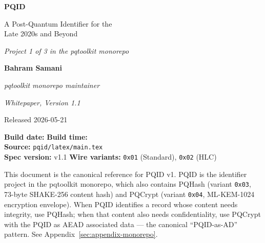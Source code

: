 \documentclass[11pt,letterpaper]{article}
\newcommand{\pqid}{\textsf{PQID}}
\newcommand{\pqhash}{\textsf{PQHash}}
\newcommand{\pqcrypt}{\textsf{PQCrypt}}
\newcommand{\pqtoolkit}{\textsf{pqtoolkit}}
\newcommand{\code}[1]{\texttt{#1}}
\begin{document}
\begin{titlepage}
  \centering
  \vspace*{2.0cm}
  {\Huge\bfseries PQID\par}
  \vspace{0.6cm}
  {\Large A Post-Quantum Identifier for the\\Late 2020s and Beyond\par}
  \vspace{0.3cm}
  {\large\itshape Project 1 of 3 in the \pqtoolkit{} monorepo\par}
  \vspace{1.6cm}
  {\large\bfseries Bahram Samani\par}
  \vspace{0.4em}
  {\small\itshape \pqtoolkit{} monorepo maintainer\par}
  \vspace{1.6cm}
  {\large\itshape Whitepaper, Version 1.1\par}
  \vspace{0.3em}
  {\small Released 2026-05-21\par}
  \vspace{1.6cm}
  \begin{tcolorbox}[colback=gray!5,colframe=black!30,width=0.78\textwidth]
    \centering\small
    \textbf{Build date:} \buildDate \quad\textbf{Build time:} \buildTime\\[0.4em]
    \textbf{Source:} \texttt{pqid/latex/main.tex}\\[0.4em]
    \textbf{Spec version:} v1.1 \quad\textbf{Wire variants:} \texttt{0x01} (Standard), \texttt{0x02} (HLC)
  \end{tcolorbox}
  \vfill
  {\small This document is the canonical reference for PQID v1. PQID is the identifier project in the \pqtoolkit{} monorepo, which also contains \pqhash{} (variant \code{0x03}, 73-byte SHAKE-256 content hash) and \pqcrypt{} (variant \code{0x04}, ML-KEM-1024 encryption envelope). When PQID identifies a record whose content needs integrity, use \pqhash{}; when that content also needs confidentiality, use \pqcrypt{} with the PQID as AEAD associated data --- the canonical ``\pqid{}-as-AD'' pattern. See Appendix~\ref{sec:appendix-monorepo}.\par}
  \vspace{0.5cm}
\end{titlepage}

\setcounter{tocdepth}{2}
\tableofcontents
\newpage

















\end{document}
